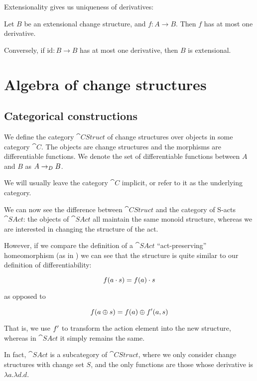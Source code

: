 Extensionality gives us uniqueness of derivatives:
\begin{prop}
  Let $B$ be an extensional change structure, and $f: A \rightarrow B$. Then $f$ has at
  most one derivative.

  Conversely, if $\textrm{id}: B \rightarrow B$ has at most one derivative, then
  $B$ is extensional.
\end{prop}

\section{Algebra of change structures}
\label{sec:algebra}

\subsection{Categorical constructions}

\begin{defn}
  We define the category $\cat{CStruct}$ of change structures over objects in
  some category $\cat{C}$. The objects are
  change structures and the morphisms are differentiable functions. We denote
  the set of differentiable functions between $A$ and $B$ as $A \rightarrow_{D} B$.
  
  We will usually leave the category $\cat{C}$ implicit, or refer to it as the
  underlying category.
\end{defn}

We can now see the difference between $\cat{CStruct}$ and the category of
S-acts $\cat{SAct}$: the objects of $\cat{SAct}$ all maintain the same monoid
structure, whereas we are interested in changing the structure of the act.

However, if we compare the definition of a $\cat{SAct}$ ``act-preserving''
homeomorphism (as in \cite{kilp2000monoids}) we can see that the structure is quite similar to our definition
of differentiability:

$$f(a \cdot s) = f(a) \cdot s$$

as opposed to

$$f(a \oplus s) = f(a) \oplus f'(a, s)$$

That is, we use $f'$ to transform the action element into the new
structure, whereas in $\cat{SAct}$ it simply remains the same.

In fact, $\cat{SAct}$ is a subcategory of $\cat{CStruct}$, where we only
consider change structures with change set $S$, and the only functions are those
whose derivative is $\lambda a. \lambda d. d$.

